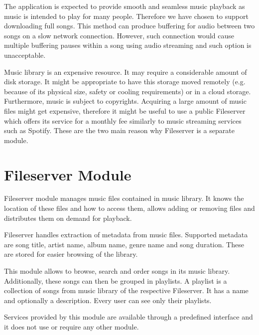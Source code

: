 \par
The application is expected to provide smooth and seamless music playback as music is intended to play for many people. Therefore we have chosen to support downloading full songs. This method can produce buffering for audio between two songs on a slow network connection. However, such connection would cause multiple buffering pauses within a song using audio streaming and such option is unacceptable.
\par
Music library is an expensive resource. It may require a considerable amount of disk storage. It might be appropriate to have this storage moved remotely (e.g. because of its physical size, safety or cooling requirements) or in a cloud storage. Furthermore, music is subject to copyrights. Acquiring a large amount of music files might get expensive, therefore it might be useful to use a public Fileserver which offers its service for a monthly fee similarly to music streaming services such as Spotify. These are the two main reason why Fileserver is a separate module.














\section{Fileserver Module}

Fileserver module manages music files contained in music library. It knows the location of these files and how to access them, allows adding or removing files and distributes them on demand for playback.
\par
Fileserver handles extraction of metadata from music files. Supported metadata are song title, artist name, album name, genre name and song duration. These are stored for easier browsing of the library.
\par
This module allows to browse, search and order songs in its music library. Additionally, these songs can then be grouped in playlists. A playlist is a collection of songs from music library of the respective Fileserver. It has a name and optionally a description. Every user can see only their playlists.
\par
Services provided by this module are available through a predefined interface and it does not use or require any other module.

